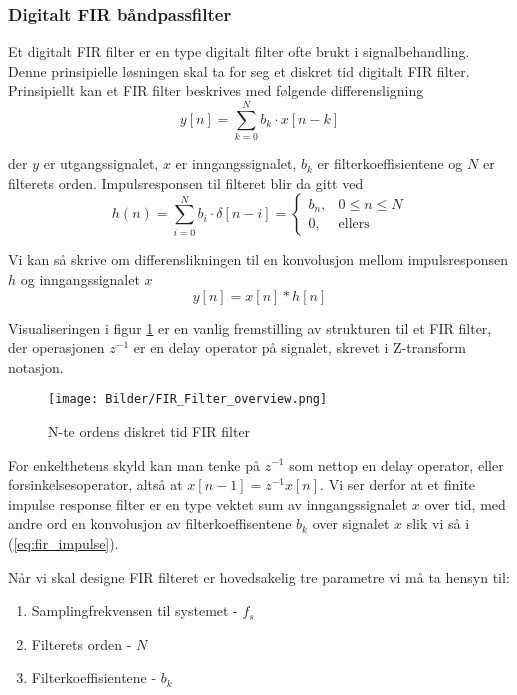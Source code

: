 \subsubsection{Digitalt FIR båndpassfilter}
\setcounter{equation}{0}
Et digitalt FIR filter er en type digitalt filter ofte brukt i signalbehandling. Denne prinsipielle løsningen 
skal ta for seg et diskret tid digitalt FIR filter. Prinsipiellt kan et FIR filter beskrives med følgende differensligning \cite{dsp_self}
\begin{equation}
    \label{eq:fir_diff}
    y[n] = \sum_{k=0}^{N} b_k \cdot x[n-k]
\end{equation}

der $y$ er utgangssignalet, $x$ er inngangssignalet, $b_k$ er filterkoeffisientene og $N$ er filterets orden.
Impulsresponsen til filteret blir da gitt ved 
\begin{equation}
    h(n) = \sum_{i=0}^{N} b_i \cdot \delta[n-i] = \begin{cases}
        b_n, &0 \leq n \leq N \\
        0, &\text{ellers}
    \end{cases}
\end{equation}

Vi kan så skrive om differenslikningen til en konvolusjon mellom impulsresponsen $h$ og inngangssignalet $x$
\begin{equation}
    \label{eq:fir_impulse}
    y[n] = x[n] \ast h[n]
\end{equation}

Visualiseringen i figur \ref{fig:fir_filter_overview} er en vanlig fremstilling av 
strukturen til et FIR filter, der operasjonen $z^{-1}$ er en delay operator på signalet, skrevet i Z-transform notasjon.

\begin{figure}[H]
    \centering
    \texttt{[image: Bilder/FIR\_Filter\_overview.png]}
    \caption{N-te ordens diskret tid FIR filter \cite{fir_wiki}}
    \label{fig:fir_filter_overview}
\end{figure}

For enkelthetens skyld kan man tenke på $z^{-1}$ som nettop en delay operator, eller forsinkelsesoperator, 
altså at $x[n-1] = z^{-1}x[n]$. Vi ser derfor at et finite impulse response filter er en type vektet sum av 
inngangssignalet $x$ over tid, med andre ord en konvolusjon av filterkoeffisentene $b_k$ over signalet $x$ 
slik vi så i (\ref{eq:fir_impulse}).

Når vi skal designe FIR filteret er hovedsakelig tre parametre vi må ta hensyn til:
\begin{enumerate}
    \item Samplingfrekvensen til systemet - $f_s$
    \item Filterets orden - $N$
    \item Filterkoeffisientene - $b_k$
\end{enumerate}

